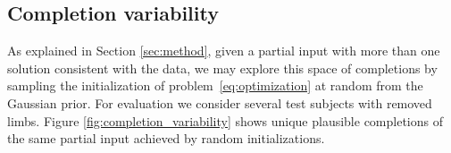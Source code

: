 \subsection{Completion variability}
\label{subsec:completion_variability}
As explained in Section \ref{sec:method}, given a partial input with more than one solution consistent with the data, we may explore this space of completions by sampling the initialization of problem~\ref{eq:optimization} at random from the Gaussian prior. For evaluation we consider several test subjects with removed limbs. Figure \ref{fig:completion_variability} shows unique plausible completions of the same partial input achieved by random initializations.


\begin{figure}
\centering
\resizebox{1.05\columnwidth}{!}{
\begin{tabular}{c@{\hskip 5mm}|@{\hskip 5mm}cccc}
Input & \multicolumn{4}{c}{Completions} \hspace{5mm} \\ \\
\texttt{[image: ./figures/both\_arms.png]} &
\texttt{[image: ./figures/both\_arms\_2.png]} &
\texttt{[image: ./figures/both\_arms\_1.png]} &
\texttt{[image: ./figures/both\_arms\_3.png]} &
\texttt{[image: ./figures/both\_arms\_4.png]} \\
\texttt{[image: ./figures/torso.png]} &
\texttt{[image: ./figures/torso\_1.png]} &
\texttt{[image: ./figures/torso\_2.png]} &

\end{tabular}}
\end{figure}
